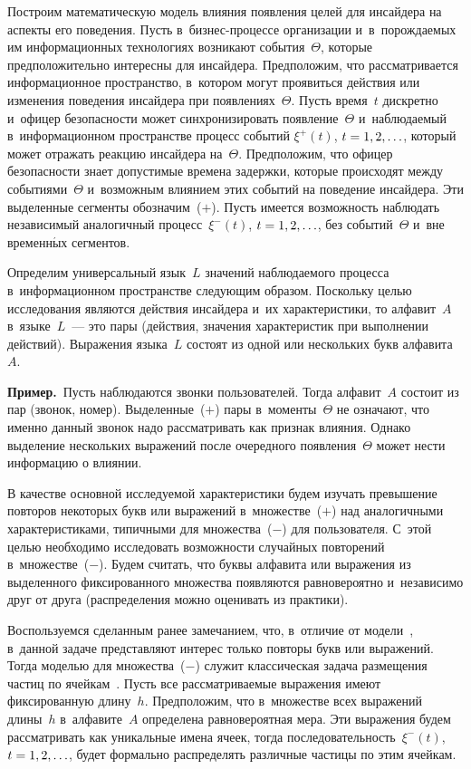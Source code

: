 \begin{multicols}{2}
  Построим математическую модель влияния появления целей для инсайдера на 
аспекты его поведения. Пусть в~бизнес-процессе организации и~в~порождаемых 
им информационных технологиях возникают события~$\Theta$, которые 
предположительно интересны для инсайдера. Предположим, что рассматривается 
информационное пространство, в~котором могут проявиться действия или 
изменения поведения инсайдера при появлениях~$\Theta$. Пусть время~$t$ 
дискретно и~офицер безопасности может синхронизировать появление~$\Theta$ 
и~наблюдаемый в~информационном пространстве процесс событий $\xi^+(t)$, 
$t\hm=1,2,\ldots$, который может отражать реакцию инсайдера на~$\Theta$. 
Предположим, что офицер безопасности знает допустимые времена задержки, 
которые происходят между событиями~$\Theta$ и~возможным влиянием этих 
событий на поведение инсайдера. Эти выделенные сегменты обозначим~($+$). 
Пусть имеется возможность наблюдать независимый аналогичный процесс~$\xi^-(t)$,  
$t\hm = 1, 2,\ldots$, без событий~$\Theta$ и~вне временн$\acute{\mbox{ы}}$х сегментов. 
  
  Определим универсальный язык~$L$ значений наблюдаемого процесса 
в~информационном пространстве следующим образом. Поскольку целью 
исследования являются действия инсайдера и~их характеристики, то алфавит~$A$ 
в~языке~$L$~--- это пары (действия, значения характеристик при выполнении 
действий). Выражения языка~$L$ состоят из одной или нескольких букв 
алфавита~$A$.
  
  \bigskip
  
  \noindent
  \textbf{Пример.}\ Пусть наблюдаются звонки пользователей. Тогда 
алфавит~$A$ состоит из пар (звонок, номер). Выделенные~($+$) пары 
в~моменты~$\Theta$ не означают, что именно данный звонок надо рассматривать 
как признак влияния. Однако выделение нескольких выражений после очередного 
появления~$\Theta$ может нести информацию о влиянии.
  
  В качестве основной исследуемой характеристики будем изучать превышение 
повторов некоторых букв или выражений в~множестве~($+$) над аналогичными 
характеристиками, типичными для множества~($-$) для пользователя. С~этой 
целью необходимо исследовать возможности случайных повторений 
в~множестве~($-$). Будем считать, что буквы алфавита или выражения из 
выделенного фиксированного множества появляются равновероятно и~независимо 
друг от друга (распределения можно оценивать из практики).
  
  Воспользуемся сделанным ранее замечанием, что, в~отличие от 
модели~\cite{10-gr}, в~данной задаче представляют интерес только повторы букв 
или выражений. Тогда моделью для множества~($-$) служит классическая задача 
размещения частиц по ячейкам~\cite{12-gr}. Пусть все рассматриваемые 
выражения имеют фиксированную длину~$h$. Предположим, что в~множестве 
всех выражений длины~$h$ в~алфавите~$A$ определена равновероятная мера. 
Эти выражения будем рассматривать как уникальные имена ячеек, тогда 
последовательность~$\xi^-(t)$, $t \hm= 1, 2,\ldots$, будет формально распределять 
различные частицы по этим ячейкам. 
  

\end{multicols}
